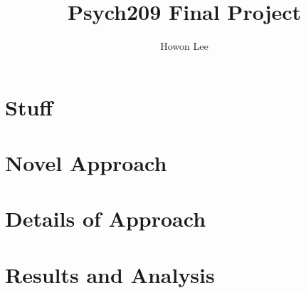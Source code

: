 \documentclass[12pt]{article}
\begin{document}
\title{Psych209 Final Project}
\author{Howon Lee}
\maketitle




\section{Stuff} %

\section{} %

\section{} %

\section{Novel Approach} %

\section{Details of Approach}%

\section{Results and Analysis}


\end{document}
